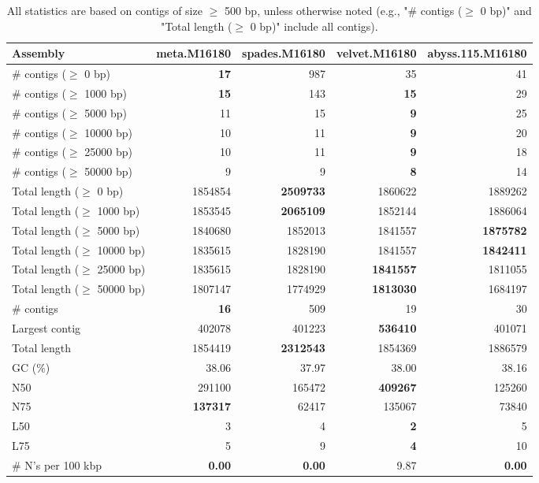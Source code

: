 \documentclass[12pt,a4paper]{article}
\begin{document}
\begin{table}[ht]
\begin{center}
\caption{All statistics are based on contigs of size $\geq$ 500 bp, unless otherwise noted (e.g., "\# contigs ($\geq$ 0 bp)" and "Total length ($\geq$ 0 bp)" include all contigs).}
\begin{tabular}{|l*{4}{|r}|}
\hline
Assembly & meta.M16180 & spades.M16180 & velvet.M16180 & abyss.115.M16180 \\ \hline
\# contigs ($\geq$ 0 bp) & {\bf 17} & 987 & 35 & 41 \\ \hline
\# contigs ($\geq$ 1000 bp) & {\bf 15} & 143 & {\bf 15} & 29 \\ \hline
\# contigs ($\geq$ 5000 bp) & 11 & 15 & {\bf 9} & 25 \\ \hline
\# contigs ($\geq$ 10000 bp) & 10 & 11 & {\bf 9} & 20 \\ \hline
\# contigs ($\geq$ 25000 bp) & 10 & 11 & {\bf 9} & 18 \\ \hline
\# contigs ($\geq$ 50000 bp) & 9 & 9 & {\bf 8} & 14 \\ \hline
Total length ($\geq$ 0 bp) & 1854854 & {\bf 2509733} & 1860622 & 1889262 \\ \hline
Total length ($\geq$ 1000 bp) & 1853545 & {\bf 2065109} & 1852144 & 1886064 \\ \hline
Total length ($\geq$ 5000 bp) & 1840680 & 1852013 & 1841557 & {\bf 1875782} \\ \hline
Total length ($\geq$ 10000 bp) & 1835615 & 1828190 & 1841557 & {\bf 1842411} \\ \hline
Total length ($\geq$ 25000 bp) & 1835615 & 1828190 & {\bf 1841557} & 1811055 \\ \hline
Total length ($\geq$ 50000 bp) & 1807147 & 1774929 & {\bf 1813030} & 1684197 \\ \hline
\# contigs & {\bf 16} & 509 & 19 & 30 \\ \hline
Largest contig & 402078 & 401223 & {\bf 536410} & 401071 \\ \hline
Total length & 1854419 & {\bf 2312543} & 1854369 & 1886579 \\ \hline
GC (\%) & 38.06 & 37.97 & 38.00 & 38.16 \\ \hline
N50 & 291100 & 165472 & {\bf 409267} & 125260 \\ \hline
N75 & {\bf 137317} & 62417 & 135067 & 73840 \\ \hline
L50 & 3 & 4 & {\bf 2} & 5 \\ \hline
L75 & 5 & 9 & {\bf 4} & 10 \\ \hline
\# N's per 100 kbp & {\bf 0.00} & {\bf 0.00} & 9.87 & {\bf 0.00} \\ \hline
\end{tabular}
\end{center}
\end{table}
\end{document}
